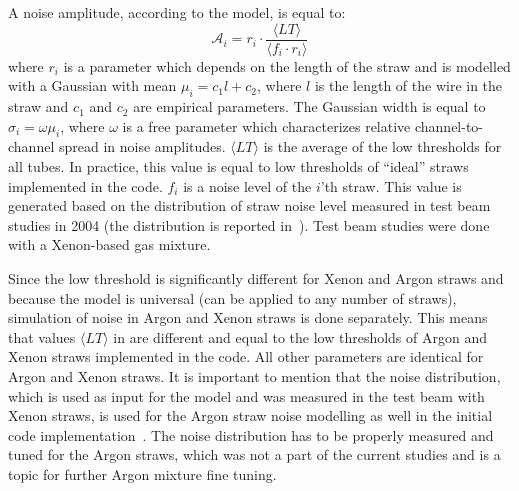 

A noise amplitude, according to the model, is equal to:
\begin{equation}
 \mathcal A_{i} = r_{i} \cdot \dfrac{\langle LT \rangle}{\langle f_i \cdot r_i \rangle}
 \label{eq:ampl_noise}
\end{equation}
where $r_{i}$ is a parameter which depends on the length of the straw and is modelled with a Gaussian with mean $\mu_i = c_1 l + c_2$, 
where $l$ is the length of the wire in the straw and $c_1$ and $c_2$ are empirical parameters.
The Gaussian width is equal to $\sigma_i = \omega \mu_i$, where $\omega$ is a free parameter which characterizes
relative channel-to-channel spread in noise amplitudes.
$\langle LT \rangle$ is the average of the low thresholds for all tubes. In practice, this value is equal to low thresholds of ``ideal'' straws 
implemented in the code.
$f_{i}$ is a noise level of the $i$'th straw. This value is generated based on the distribution of straw noise level measured in test beam studies in 2004 
(the distribution is reported in~\cite{kittelmann_thesis}).
Test beam studies were done with a Xenon-based gas mixture. 

Since the low threshold is significantly different for Xenon and Argon straws and because the model is universal (can be applied to any number of straws), 
simulation of noise in Argon and Xenon straws is done separately. This means that values $\langle LT \rangle$ in  are 
different and equal to the low thresholds of Argon and Xenon straws implemented in the code. All other parameters are identical for Argon and Xenon straws.
It is important to mention that the noise distribution, which is used as input for the model and was measured in the test beam with Xenon straws,
is used for the Argon straw noise modelling as well in the initial code implementation~\cite{anatoli_private_communication}. 
The noise distribution has to be properly measured and tuned for the Argon straws, which
was not a part of the current studies and is a topic for further Argon mixture fine tuning.

